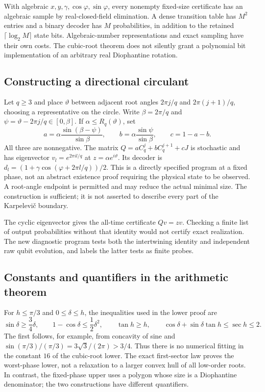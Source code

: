 With algebraic $x,y,\gamma,\cos\varphi,\sin\varphi$, every nonempty fixed-size certificate has an algebraic sample by real-closed-field elimination. A dense transition table has $M^2$ entries and a binary decoder has $M$ probabilities, in addition to the retained $\lceil\log_2M\rceil$ state bits. Algebraic-number representations and exact sampling have their own costs. The cubic-root theorem does not silently grant a polynomial bit implementation of an arbitrary real Diophantine rotation.

\subsection{Constructing a directional circulant}
Let $q\ge3$ and place $\vartheta$ between adjacent root angles $2\pi j/q$ and $2\pi(j+1)/q$, choosing a representative on the circle. Write $\beta=2\pi/q$ and $\psi=\vartheta-2\pi j/q\in[0,\beta]$. If $\alpha\le R_q(\vartheta)$, set
\[
 a=\alpha\frac{\sin(\beta-\psi)}{\sin\beta},\qquad
 b=\alpha\frac{\sin\psi}{\sin\beta},\qquad c=1-a-b.
\]
All three are nonnegative. The matrix $Q=aC_q^j+bC_q^{j+1}+cJ$ is stochastic and has eigenvector $v_l=e^{2\pi il/q}$ at $z=\alpha e^{i\vartheta}$. Its decoder is $d_l=(1+\gamma\cos(\varphi+2\pi l/q))/2$. This is a directly specified program at a fixed phase, not an abstract existence proof requiring the physical state to be observed. A root-angle endpoint is permitted and may reduce the actual minimal size. The construction is sufficient; it is not asserted to describe every part of the Karpelevi\v c boundary.

The cyclic eigenvector gives the all-time certificate $Qv=zv$. Checking a finite list of output probabilities without that identity would not certify exact realization. The new diagnostic program tests both the intertwining identity and independent raw qubit evolution, and labels the latter tests as finite probes.

\subsection{Constants and quantifiers in the arithmetic theorem}
For $h\le\pi/3$ and $0\le\delta\le h$, the inequalities used in the lower proof are
\[
 \sin\delta\ge\frac34\delta,\qquad
 1-\cos\delta\le\frac12\delta^2,\qquad
 \tan h\ge h,\qquad
 \cos\delta+\sin\delta\tan h\le\sec h\le2.
\]
The first follows, for example, from concavity of sine and
$\sin(\pi/3)/(\pi/3)=3\sqrt3/(2\pi)>3/4$. Thus there is no numerical fitting in the constant $16$ of the cubic-root lower. The exact first-sector law proves the worst-phase lower, not a relaxation to a larger convex hull of all low-order roots. In contrast, the fixed-phase upper uses a polygon whose size is a Diophantine denominator; the two constructions have different quantifiers.

